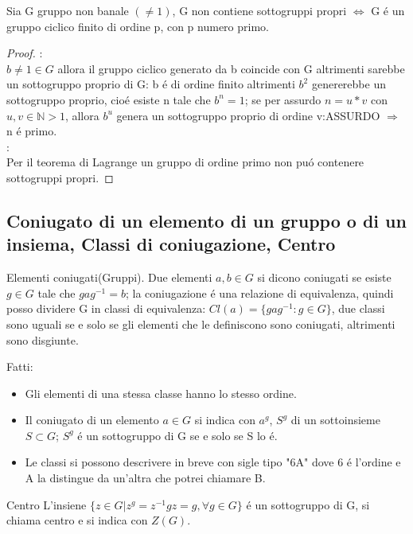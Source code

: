 \documentclass[oneside,12pt]{memoir}
\begin{document}
Sia G gruppo non banale $(\neq1)$, G non contiene sottogruppi propri $\iff$ G \'e un gruppo ciclico finito di ordine p, con p numero primo.
\begin{proof}
\fbox{$\Rightarrow$}:\\
$b\neq1\in G$ allora il gruppo ciclico generato da b coincide con G altrimenti sarebbe un sottogruppo proprio di G: b \'e di ordine finito altrimenti $b^2$ genererebbe un sottogruppo proprio, cio\'e esiste n tale che $b^n=1$; se per assurdo $n=u*v$ con $u,v\in \mathbb{N} > 1$, allora $b^u$ genera un sottogruppo proprio di ordine v:ASSURDO $\Rightarrow$ n \'e primo.\\
\fbox{$\Leftarrow$}:\\
Per il teorema di Lagrange un gruppo di ordine primo non pu\'o contenere sottogruppi propri.
\end{proof}


\subsection{Coniugato di un elemento di un gruppo o di un insiema, Classi di coniugazione, Centro}
\begin{definition}{Elementi coniugati(Gruppi).}
Due elementi $a,b\in G$ si dicono coniugati se esiste $g\in G$ tale che $gag^{-1}=b$; la coniugazione \'e una relazione di equivalenza, quindi posso dividere G in classi di equivalenza: $Cl(a)=\{gag^{-1}: g\in G\}$, due classi sono uguali se e solo se gli elementi che le definiscono sono coniugati, altrimenti sono disgiunte. 
\end{definition}

Fatti:
\begin{itemize}
\item Gli elementi di una stessa classe hanno lo stesso ordine.
\item Il coniugato di un elemento $a\in G$ si indica con $a^g$, $S^g$ di un sottoinsieme $S\subset G$; $S^g$ \'e un sottogruppo di G se e solo se S lo \'e.
\item Le classi si possono descrivere in breve con sigle tipo "6A" dove 6 \'e l'ordine e A la distingue da un'altra che potrei chiamare B.
\end{itemize}

\begin{definition}{Centro}
 L'insiene $\{z \in G | z^g=z^{-1}gz=g, \forall g \in G\}$ \'e un sottogruppo di G, si chiama centro e si indica con $Z(G)$.
\end{definition}
\end{document}
